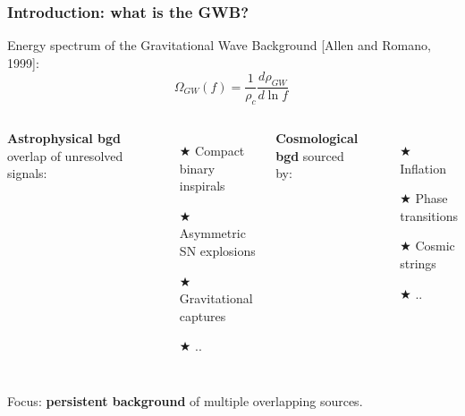 
\begin{frame}
	\frametitle{Introduction: what is the GWB?}
     	Energy spectrum of the Gravitational Wave Background [Allen and Romano, 1999]:
    	\begin{equation}
			\Omega_{GW}(f) = \frac{1}{\rho_c} \frac{d\rho_{GW}}{d\ln f}\,
		\end{equation}
        	\begin{columns}[]
            \footnotesize
        		\centering
				\textbf{Astrophysical bgd\qquad\qquad}
				\flushleft
				overlap of unresolved signals: 
                \begin{itemize}
					\item[$\bigstar$] Compact binary inspirals 
					\item[$\bigstar$] Asymmetric SN explosions
                    \item[$\bigstar$] Gravitational captures
					\item[$\bigstar$] ..
			\end{itemize}

       		\centering
			\textbf{Cosmological bgd\qquad\qquad\qquad\qquad}
            \flushleft
            sourced by:
			\begin{itemize}
				\item[$\bigstar$] Inflation
				\item[$\bigstar$] Phase transitions
				\item[$\bigstar$] Cosmic strings
				\item[$\bigstar$] ..
			\end{itemize}			
	\end{columns}
	\bigskip

              \begin{block}{}
              Focus: \textbf{persistent background} of multiple overlapping sources.\\
          \end{block}


\end{frame}

